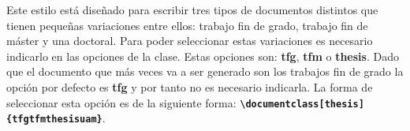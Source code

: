 Este estilo está diseñado para escribir tres tipos de documentos distintos que tienen pequeñas variaciones entre ellos: trabajo fin de grado, trabajo fin de máster y una doctoral. Para poder seleccionar estas variaciones es necesario indicarlo en las opciones de la clase. Estas opciones son: \textbf{tfg}, \textbf{tfm} o \textbf{thesis}. Dado que el documento que más veces va a ser generado son los trabajos fin de grado la opción por defecto es \textbf{tfg} y por tanto no es necesario indicarla. La forma de seleccionar esta opción es de la siguiente forma: \textbf{\texttt{{\textbackslash}documentclass[thesis]\{tfgtfmthesisuam\}}}.
